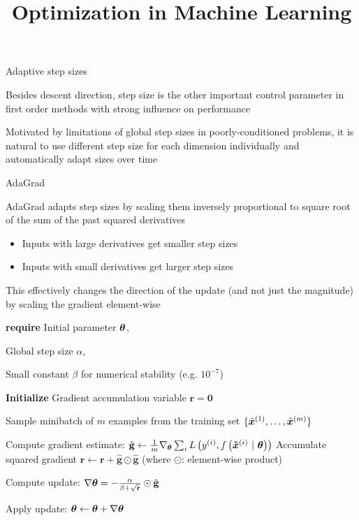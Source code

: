 \documentclass[11pt,compress,t,notes=noshow, xcolor=table]{beamer}
\title{Optimization in Machine Learning}
\begin{document}


\begin{framei}{Adaptive step sizes}
\item Besides descent direction, step size is the other important control parameter in first order methods with strong influence on performance
\item Motivated by limitations of global step sizes in poorly-conditioned problems, it is natural to use different step size for each dimension individually and automatically adapt sizes over time
\vfill
{}
\end{framei}


\begin{framei}[fs=footnotesize]{AdaGrad}
\item AdaGrad adapts step sizes by
scaling them inversely proportional to square root of the sum of the past squared derivatives
\begin{itemize}
\item Inputs with large derivatives get smaller step sizes
\item Inputs with small derivatives get larger step sizes
\end{itemize}
\item This effectively changes the direction of the update (and not just the magnitude) by scaling the gradient element-wise
\begin{algorithm}[H]
\footnotesize
\caption{AdaGrad}
\begin{algorithmic}[1]
\State \textbf{require} Initial parameter $\bm{\theta}$, \strut Global step size $\alpha$, \strut Small constant $\beta$ for numerical stability (e.g. $10^{-7}$) \strut 
\State \textbf{Initialize} Gradient accumulation variable $\mathbf{r} = \mathbf{0} $
\State \parbox[t]{\dimexpr\linewidth-\algorithmicindent}{Sample minibatch of $m$ examples from the training set $\{\tilde{\bm{x}}^{(1)},\dots,\tilde{\bm{x}}^{(m)}\}$ \strut}
\State Compute gradient estimate: $\hat{\mathbf{g}} \leftarrow \frac{1}{m} \nabla_{\bm{\theta}} \sum_{i} L\left(y^{(i)}, f\left(\bm{\tilde{x}}^{(i)} ~|~ \bm{\theta}\right)\right)$
\State Accumulate squared gradient $\mathbf{r} \leftarrow \mathbf{r} + \hat{\mathbf{g}} \odot  \hat{\mathbf{g}}$ (where $\odot$: element-wise product) %
\State \parbox[t]{\dimexpr\linewidth-\algorithmicindent}{Compute update: $\nabla \bm{\theta} = - \frac{\alpha}{\beta + \sqrt\mathbf{r}} \odot \hat{\mathbf{g}}$ \strut}
\State Apply update: $\bm{\theta} \leftarrow \bm{\theta} + \nabla\bm{\theta}$
\EndWhile
\end{algorithmic}
\end{algorithm}
\end{framei}
\end{document}
